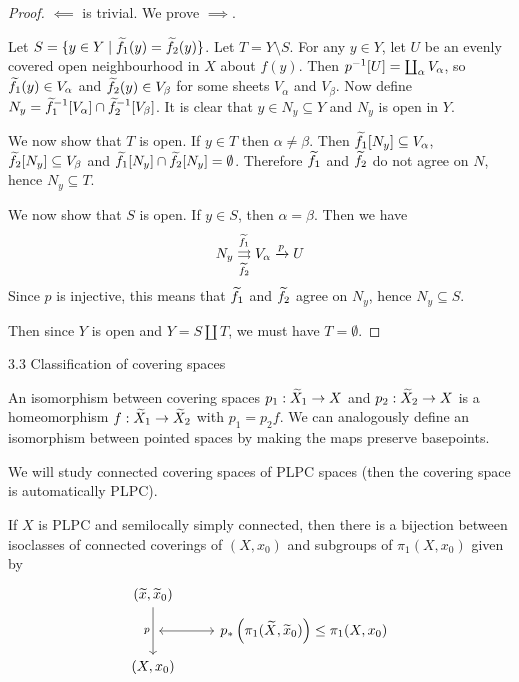 \begin{proof}
	$\impliedby$ is trivial.
	We prove $\implies$.
	
	Let $S = \{y \in Y \mid \widetilde f_1(y) = \widetilde f_2(y)\}$.
	Let $T = Y \setminus S$.
	For any $y \in Y$, let $U$ be an evenly covered open neighbourhood in $X$ about $f(y)$.
	Then $p^{-1}[U] = \coprod_\alpha V_\alpha$, so $\widetilde f_1(y) \in V_\alpha$ and $\widetilde f_2(y) \in V_\beta$ for some sheets $V_\alpha$ and $V_\beta$.
	Now define $N_y = \widetilde f_1^{-1}[V_\alpha] \cap \widetilde f_2^{-1}[V_\beta]$.
	It is clear that $y \in N_y \subseteq Y$ and $N_y$ is open in $Y$.
	
	We now show that $T$ is open.
	If $y \in T$ then $\alpha\neq\beta$.
	Then $\widetilde f_1[N_y] \subseteq V_\alpha$, $\widetilde f_2[N_y] \subseteq V_\beta$ and $\widetilde f_1[N_y] \cap \widetilde f_2[N_y] = \emptyset$.
	Therefore $\widetilde f_1$ and $\widetilde f_2$ do not agree on $N$, hence $N_y \subseteq T$.
	
	We now show that $S$ is open.
	If $y \in S$, then $\alpha=\beta$.
	Then we have
	\[N_y \underset{\widetilde f_2}{\overset{\widetilde f_1}{\rightrightarrows}} V_\alpha \xrightarrow{p} U\]
	Since $p$ is injective, this means that $\widetilde f_1$ and $\widetilde f_2$ agree on $N_y$, hence $N_y \subseteq S$.
	
	Then since $Y$ is open and $Y = S \amalg T$, we must have $T=\emptyset$.
\end{proof}

3.3 Classification of covering spaces

\begin{defn}
	An isomorphism between covering spaces $p_1: \widetilde X_1 \to X$ and $p_2: \widetilde X_2 \to X$ is a homeomorphism $f: \widetilde X_1 \to \widetilde X_2$ with $p_1=p_2f$.
	We can analogously define an isomorphism between pointed spaces by making the maps preserve basepoints.
\end{defn}

We will study connected covering spaces of PLPC spaces (then the covering space is automatically PLPC).

\begin{thm}
        If $X$ is PLPC and semilocally simply connected, then there is a bijection between isoclasses of connected coverings of $(X,x_0)$ and subgroups of $\pi_1(X,x_0)$ given by
        \[\begin{tikzcd}[row sep=tiny]
                (\wt{x},\wt{x}_0) \ar[dd, swap, "p"] & \\
                \ar[r, leftrightarrow] & p_*\left(\pi_1(\wt X,\wt x_0)\right) \leq \pi_1(X,x_0) \\
                (X,x_0) &
        \end{tikzcd}\]
\end{thm}


